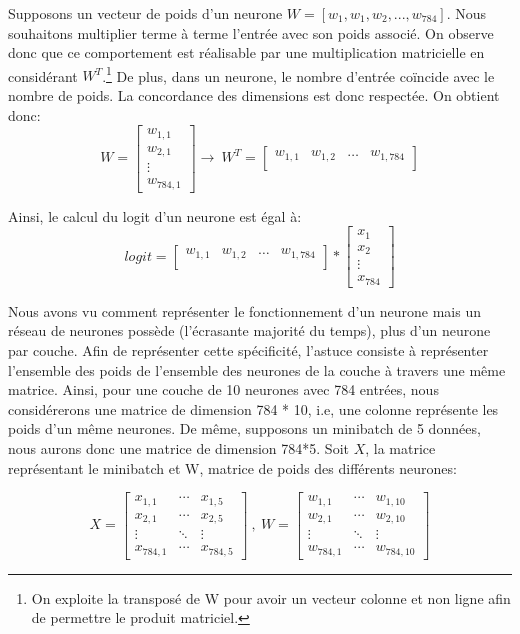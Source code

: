\noindent Supposons un vecteur de poids d'un neurone $W = [w_1, w_1, w_2,..., w_{784}]$. Nous souhaitons multiplier terme à terme l'entrée avec son poids associé. On observe donc que ce comportement est réalisable par une multiplication matricielle en considérant $W^T$.\footnote{On exploite la transposé de W pour avoir un vecteur colonne et non ligne afin de permettre le produit matriciel.} De plus, dans un neurone, le nombre d'entrée coïncide avec le nombre de poids. La concordance des dimensions est donc respectée. On obtient donc:
$$W=\begin{bmatrix}
   w_{1,1} \\
   w_{2,1} \\
   \vdots \\
   w_{784,1}
\end{bmatrix} \longrightarrow \
W^T=\begin{bmatrix}
   w_{1,1} & w_{1,2} & \ldots & w_{1,784}\\
\end{bmatrix}$$

\noindent Ainsi, le calcul du logit d'un neurone est égal à:
$$logit=\begin{bmatrix}
w_{1,1} & w_{1,2} & \ldots & w_{1,784}\\
\end{bmatrix}*
\begin{bmatrix}
   x_{1} \\
   x_{2} \\
   \vdots \\
   x_{784}
\end{bmatrix}$$

\noindent Nous avons vu comment représenter le fonctionnement d'un neurone mais un réseau de neurones possède (l'écrasante majorité du temps), plus d'un neurone par couche. Afin de représenter cette spécificité, l'astuce consiste à représenter l'ensemble des poids de l'ensemble des neurones de la couche à travers une même matrice. Ainsi, pour une couche de 10 neurones avec 784 entrées, nous considérerons une matrice de dimension 784 * 10, i.e, une colonne représente les poids d'un même neurones. De même, supposons un minibatch de 5 données, nous aurons donc une matrice de dimension 784*5. Soit $X$, la matrice représentant le minibatch et W, matrice de poids des différents neurones:

$$X=\begin{bmatrix}
   x_{1,1} & \cdots& x_{1,5} \\
   x_{2,1} & \cdots& x_{2,5}\\
   \vdots &\ddots& \vdots\\
   x_{784,1}& \cdots& x_{784,5}
\end{bmatrix} \ , \ W=\begin{bmatrix}
   w_{1,1} & \cdots& w_{1,10} \\
   w_{2,1} & \cdots &w_{2,10}\\
   \vdots & \ddots& \vdots\\
   w_{784,1}& \cdots &w_{784,10}
\end{bmatrix}$$

